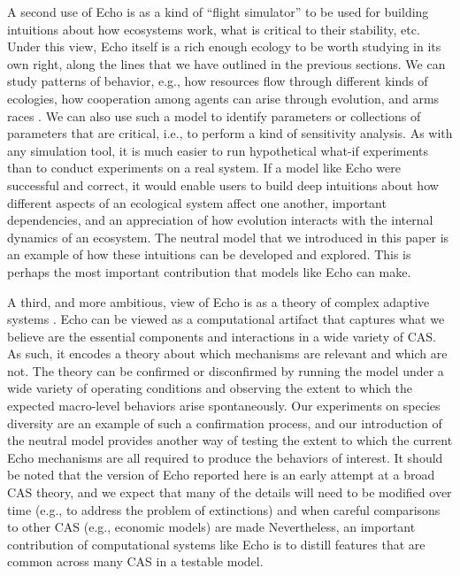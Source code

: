 A second use of Echo is as a kind of ``flight simulator'' to be used
for building intuitions about how ecosystems work, what is critical
to their stability, etc.  Under this view, Echo itself is a rich enough
ecology to be worth studying in its own right, along the lines that we
have outlined in the previous sections.
We can study patterns of behavior,
e.g., how resources flow through different kinds of ecologies, how
cooperation among agents can arise through evolution, and arms races
\cite{Holland94}.  We can also use such a model to identify 
parameters or collections of parameters that are critical, i.e., to
perform a kind of sensitivity analysis.  As with any simulation tool, 
it is much easier to run hypothetical what-if experiments than to conduct
experiments on a real system.  If a model like Echo were successful
and correct, it would enable users to build deep intuitions about how
different aspects of an ecological system affect one another,
important dependencies, and an appreciation of how evolution interacts
with the internal dynamics of an ecosystem.  The neutral model that we
introduced in this paper is an example of how these intuitions can be
developed and explored.  This is perhaps the most important
contribution that models like Echo can make.

A third, and more ambitious, view of Echo is as a theory of complex
adaptive systems \cite{Holland95a}.  Echo can be viewed as a
computational artifact that captures what we believe are the essential
components and interactions in a wide variety of CAS.  As such, it
encodes a theory about which mechanisms are relevant and which are
not.  The theory can be confirmed or disconfirmed by running the model
under a wide variety of operating conditions and observing the extent
to which the expected macro-level behaviors arise spontaneously.  Our
experiments on species diversity are an example of such a confirmation
process, and our introduction of the neutral model provides another
way of testing the extent to which the current Echo mechanisms are all
required to produce the behaviors of interest.  It should be noted
that the version of Echo reported here is an early attempt at a broad
CAS theory, and we expect that many of the details will need to be
modified over time (e.g., to address the problem of extinctions) and
when careful comparisons to other CAS (e.g., economic models) are made
Nevertheless, an important contribution of computational systems like
Echo is to distill features that are common across many CAS in a
testable model.

